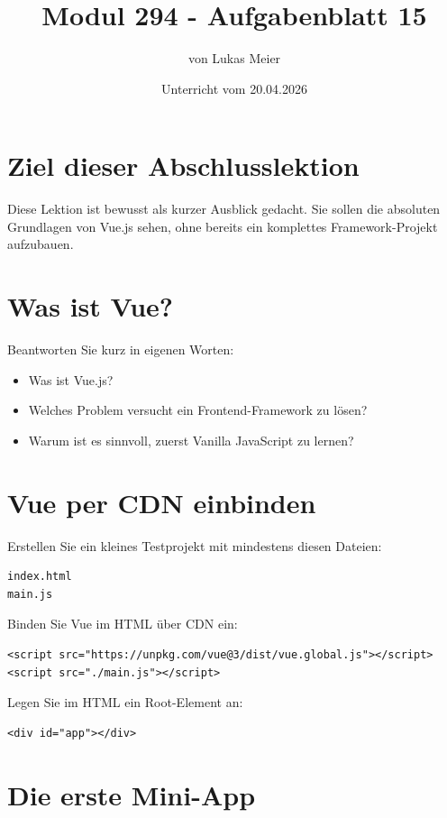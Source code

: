 \documentclass[a4paper,12pt]{article}
\title{Modul 294 - Aufgabenblatt 15}
\author{von Lukas Meier}
\date{Unterricht vom 20.04.2026}
\begin{document}
\maketitle

\section{Ziel dieser Abschlusslektion}

Diese Lektion ist bewusst als kurzer Ausblick gedacht. Sie sollen die absoluten Grundlagen von Vue.js sehen, ohne bereits ein komplettes Framework-Projekt aufzubauen.

\section{Was ist Vue?}

Beantworten Sie kurz in eigenen Worten:
\begin{itemize}
    \item Was ist Vue.js?
    \item Welches Problem versucht ein Frontend-Framework zu lösen?
    \item Warum ist es sinnvoll, zuerst Vanilla JavaScript zu lernen?
\end{itemize}

\section{Vue per CDN einbinden}

Erstellen Sie ein kleines Testprojekt mit mindestens diesen Dateien:
\begin{verbatim}
index.html
main.js
\end{verbatim}

Binden Sie Vue im HTML über CDN ein:

\begin{verbatim}
<script src="https://unpkg.com/vue@3/dist/vue.global.js"></script>
<script src="./main.js"></script>
\end{verbatim}

Legen Sie im HTML ein Root-Element an:

\begin{verbatim}
<div id="app"></div>
\end{verbatim}

\section{Die erste Mini-App}
\end{document}
